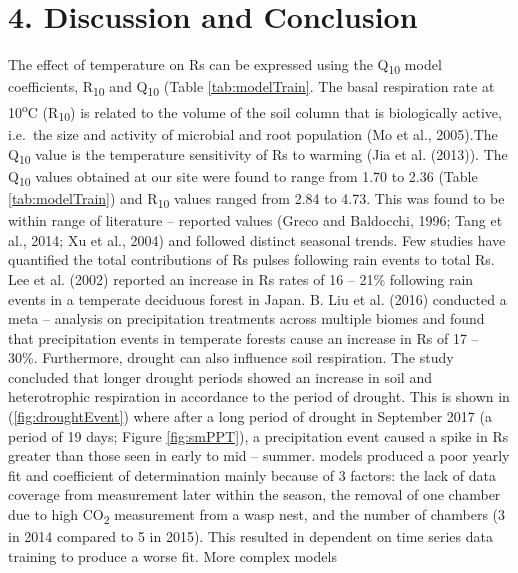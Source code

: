 \documentclass[]{elsarticle} %
\begin{document}
\hypertarget{discussion-and-conclusion}{%
\section{4. Discussion and Conclusion}\label{discussion-and-conclusion}}

The effect of temperature on Rs can be expressed using the
Q\textsubscript{10} model coefficients, R\textsubscript{10} and
Q\textsubscript{10} (Table \ref {tab:modelTrain}. The basal respiration
rate at 10\textsuperscript{o}C (R\textsubscript{10}) is related to the
volume of the soil column that is biologically active, i.e.~the size and
activity of microbial and root population (Mo et al., 2005).The
Q\textsubscript{10} value is the temperature sensitivity of Rs to
warming (Jia et al. (2013)). The Q\textsubscript{10} values obtained at
our site were found to range from 1.70 to 2.36 (Table
\ref {tab:modelTrain}) and R\textsubscript{10} values ranged from 2.84
to 4.73. This was found to be within range of literature -- reported
values (Greco and Baldocchi, 1996; Tang et al., 2014; Xu et al., 2004)
and followed distinct seasonal trends. \newline \newline Few studies
have quantified the total contributions of Rs pulses following rain
events to total Rs. Lee et al. (2002) reported an increase in Rs rates
of 16 -- 21\% following rain events in a temperate deciduous forest in
Japan. B. Liu et al. (2016) conducted a meta -- analysis on
precipitation treatments across multiple biomes and found that
precipitation events in temperate forests cause an increase in Rs of 17
-- 30\%. Furthermore, drought can also influence soil respiration. The
study concluded that longer drought periods showed an increase in soil
and heterotrophic respiration in accordance to the period of drought.
This is shown in (\ref{fig:droughtEvent}) where after a long period of
drought in September 2017 (a period of 19 days; Figure
\ref {fig:smPPT}), a precipitation event caused a spike in Rs greater
than those seen in early to mid -- summer. \newline {} models
produced a poor yearly fit and coefficient of determination mainly
because of 3 factors: the lack of data coverage from measurement later
within the season, the removal of one chamber due to high
CO\textsubscript{2} measurement from a wasp nest, and the number of
chambers (3 in 2014 compared to 5 in 2015). This resulted in dependent
on time series data training to produce a worse fit. More complex models
\end{document}
